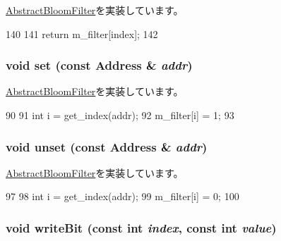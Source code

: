 \hyperlink{classAbstractBloomFilter_a6c0e9a098f0f210aa42eb2f1553804eb}{AbstractBloomFilter}を実装しています。


\begin{DoxyCode}
140 {
141     return m_filter[index];
142 }
\end{DoxyCode}
\hypertarget{classNonCountingBloomFilter_a2b666fae2a5c2b98bc5cba8e1333bcc9}{
\subsubsection[{set}]{\setlength{\rightskip}{0pt plus 5cm}void set (const {\bf Address} \& {\em addr})}}
\label{classNonCountingBloomFilter_a2b666fae2a5c2b98bc5cba8e1333bcc9}


\hyperlink{classAbstractBloomFilter_a54e1262ae5f60efeb8714d0556b3c32e}{AbstractBloomFilter}を実装しています。


\begin{DoxyCode}
90 {
91     int i = get_index(addr);
92     m_filter[i] = 1;
93 }
\end{DoxyCode}
\hypertarget{classNonCountingBloomFilter_a69b772787ea61467af679e3aa5406b41}{
\subsubsection[{unset}]{\setlength{\rightskip}{0pt plus 5cm}void unset (const {\bf Address} \& {\em addr})}}
\label{classNonCountingBloomFilter_a69b772787ea61467af679e3aa5406b41}


\hyperlink{classAbstractBloomFilter_a0a35d1c7bad19fe9362068a0d319ec5f}{AbstractBloomFilter}を実装しています。


\begin{DoxyCode}
97 {
98     int i = get_index(addr);
99     m_filter[i] = 0;
100 }
\end{DoxyCode}
\hypertarget{classNonCountingBloomFilter_ac188318778d26b44f567c5b530598c16}{
\subsubsection[{writeBit}]{\setlength{\rightskip}{0pt plus 5cm}void writeBit (const int {\em index}, \/  const int {\em value})}}
\label{classNonCountingBloomFilter_ac188318778d26b44f567c5b530598c16}



